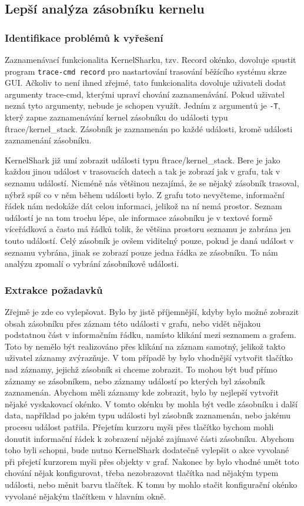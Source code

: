 \subsection{Lepší analýza zásobníku kernelu}

\subsubsection*{Identifikace problémů k vyřešení}
Zaznamenávací funkcionalita KernelSharku, tzv. Record okénko, dovoluje spustit program \texttt{trace-cmd record} pro nastartování trasování běžícího systému skrze GUI. Ačkoliv to není ihned zřejmé, tato funkcionalita dovoluje uživateli dodat argumenty trace-cmd, kterými upraví chování zaznamenávání. Pokud uživatel nezná tyto argumenty, nebude je schopen využít. Jedním z argumentů je \texttt{-T}, který zapne zaznamenávání kernel zásobníku do události typu ftrace/kernel\_stack. Zásobník je zaznamenán po každé události, kromě události zaznamenání zásobníku.

KernelShark již umí zobrazit události typu ftrace/kernel\_stack. Bere je jako každou jinou událost v trasovacích datech a tak je zobrazí jak v grafu, tak v seznamu událostí. Nicméně nás většinou nezajímá, že se nějaký zásobník trasoval, nýbrž spíš co v něm během události bylo. Z grafu toto nevyčteme, informační řádek nám nedokáže dát celou informaci, jelikož na ní nemá prostor. Seznam událostí je na tom trochu lépe, ale informace zásobníku je v textové formě víceřádková a často má řádků tolik, že většina prostoru seznamu je zabrána jen touto událostí. Celý zásobník je ovšem viditelný pouze, pokud je daná událost v seznamu vybrána, jinak se zobrazí pouze jedna řádka ze zásobníku. To nám analýzu zpomalí o vybrání zásobníkové události.

\subsubsection*{Extrakce požadavků}
Zřejmě je zde co vylepšovat. Bylo by jistě příjemnější, kdyby bylo možné zobrazit obsah zásobníku přes záznam této události v grafu, nebo vidět nějakou podstatnou část v informačním řádku, namísto klikání mezi seznamem a grafem. Toto by nemělo být realizováno přes klikání na záznam samotný, jelikož takto uživatel záznamy zvýrazňuje. V tom případě by bylo vhodnější vytvořit tlačítko nad záznamy, jejichž zásobník si chceme zobrazit. To mohou být buď přímo záznamy se zásobníkem, nebo záznamy událostí po kterých byl zásobník zaznamenán. Abychom měli záznamy kde zobrazit, bylo by nejlepší vytvořit nějaké vyskakovací okénko. V tomto okénku by mohla být vedle zásobníku i další data, například po jakém typu události byl zásobník zaznamenán, nebo jakému procesu událost patřila. Přejetím kurzoru myši přes tlačítko bychom mohli donutit informační řádek k zobrazení nějaké zajímavé části zásobníku. Abychom toho byli schopni, bude nutno KernelShark dodatečně vylepšit o akce vyvolané při přejetí kurzorem myši přes objekty v graf. Nakonec by bylo vhodné umět toto chování nějak konfigurovat, třeba nezobrazovat tlačítka nad nějakým typem události, nebo měnit barvu tlačítek. K tomu by mohlo stačit konfigurační okénko vyvolané nějakým tlačítkem v hlavním okně.


